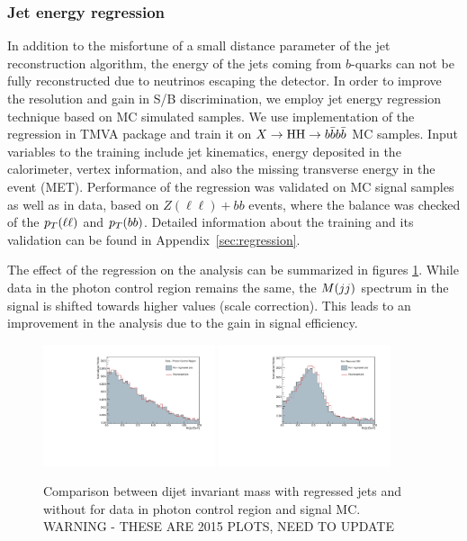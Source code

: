 \subsubsection{Jet energy regression}
\label{sec:b-reg}
In addition to the misfortune of a small distance parameter of the jet
reconstruction algorithm, the energy of the jets coming from
$b$-quarks can not be fully reconstructed due to neutrinos escaping
the detector.  In order to improve the \Mjj resolution and gain in S/B
discrimination, we employ jet energy regression technique based on MC
simulated samples. We use implementation of the regression in TMVA
package and train it on $X\to\mathrm{H}\mathrm{H}\to b\bar{b}b\bar{b}$ MC samples. Input variables
to the training include jet kinematics, energy deposited in the
calorimeter, vertex information, and also the missing transverse
energy in the event (MET). Performance of the regression was validated
on MC signal samples as well as in data, based on $Z(\ell\ell) + bb$
events, where the \pT balance was checked of the $p_{T}(\ell\ell)$ and
$p_{T}(bb)$.  Detailed information about the training and its validation
can be found in Appendix~\ref{sec:regression}.

The effect of the regression on the analysis can be summarized in
figures \ref{fig:bregeffect}.  While data in the photon control region
remains the same, the $M(jj)$ spectrum in the signal is shifted towards
higher values (scale correction).  This leads to an improvement in the
analysis due to the gain in signal efficiency.

\begin{figure}[thb]
  \centering
  \includegraphics[width=0.45\textwidth]{figures/sec-jets/DoubleEG_dijetmass.pdf}\hfil
  \includegraphics[width=0.45\textwidth]{figures/sec-jets/output_GluGluToHHTo2B2G_node_SM_13TeV-madgraph_dijetmass.pdf}\hfil
  \caption{Comparison between dijet invariant mass with regressed jets
    and without for data in photon control region and signal
    MC. WARNING - THESE ARE 2015 PLOTS, NEED TO UPDATE}
  \label{fig:bregeffect}
\end{figure}



